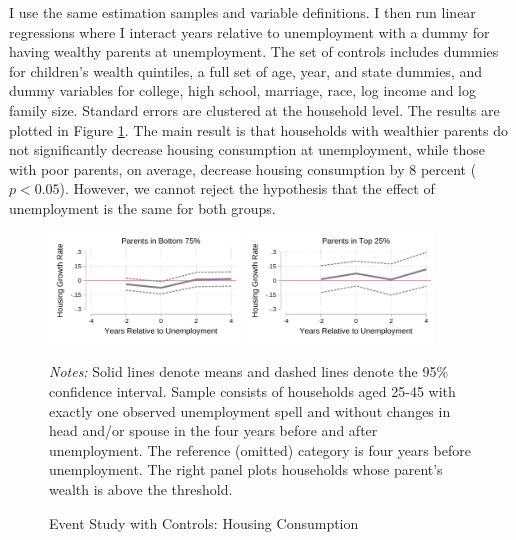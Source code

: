 \documentclass[12pt]{article}
\begin{document}
I use the same estimation samples and variable definitions. I then run linear regressions where I interact years relative to unemployment with a dummy for having wealthy parents at unemployment. The set of controls includes dummies for children's wealth quintiles, a full set of age, year, and state dummies, and dummy variables for college, high school, marriage, race, log income and log family size. Standard errors are clustered at the household level. The results are plotted in Figure \ref{fig:housinggrowthrates_controls}. The main result is that households with wealthier parents do not significantly decrease housing consumption at unemployment, while those with poor parents, on average, decrease housing consumption by 8 percent ($p<0.05$). However, we cannot reject the hypothesis that the effect of unemployment is the same for both groups.
\begin{figure}
	\caption{Event Study with Controls: Housing Consumption}\label{fig:housinggrowthrates_controls}
	\includegraphics[width=0.45\textwidth]{../tabfig/descr/PSID_housinggrowthpoor_both_controls}%
	\includegraphics[width=0.45\textwidth]{../tabfig/descr/PSID_housinggrowthrich_both_controls}
	
	{\begin{footnotesize} \textit{Notes:} Solid lines denote means and dashed lines denote the 95\% confidence interval. Sample consists of households aged 25-45 with exactly one observed unemployment spell and without changes in head and/or spouse in the four years before and after unemployment. The reference (omitted) category is four years before unemployment.  The right panel plots households whose parent's wealth is above the threshold.  \end{footnotesize}}
\end{figure}
\end{document}
